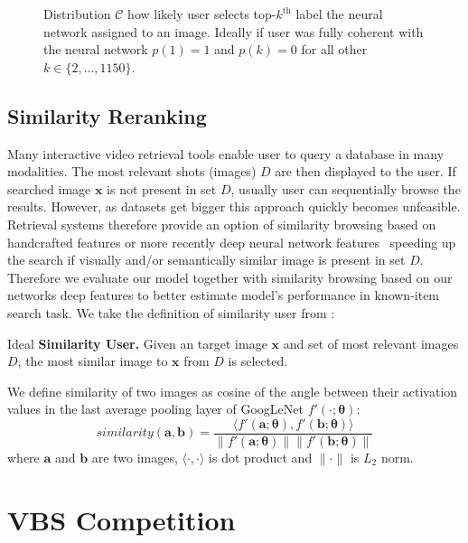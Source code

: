 \begin{figure}
	\centering
	
	
	\caption[Agreement between user and neural network labeling]{Distribution $\mathcal{C}$ how likely user selects top-$k^{\mathrm{th}}$ label the neural network assigned to an image. Ideally if user was fully coherent with the neural network $p(1)=1$ and $p(k)=0$ for all other $k\in\{2,\dots,1150\}$.
	}
	\label{fig:class_distribution}
\end{figure}


\subsection{Similarity Reranking}
Many interactive video retrieval tools enable user to query a database in many modalities. The most relevant shots (images) $D$ are then displayed to the user. If searched image $\bm{x}$ is not present in set $D$, usually user can sequentially browse the results. However, as datasets get bigger this approach quickly becomes unfeasible. Retrieval systems therefore provide an option of similarity browsing based on handcrafted features or more recently deep neural network features~\cite{lokovc2018revisiting, barthel2018fusing} speeding up the search if visually and/or semantically similar image is present in set $D$. Therefore we evaluate our model together with similarity browsing based on our networks deep features to better estimate model's performance in known-item search task. We take the definition of similarity user from \cite{kovalvcik2017comparison}:
\begin{description}[labelwidth=1em, leftmargin=!]
	\item Ideal \textbf{Similarity User.} Given an target image $\bm{x}$ and set of most relevant images $D$, the most similar image to $\bm{x}$ from $D$ is selected.
\end{description}
We define similarity of two images as cosine of the angle between their activation values in the last average pooling layer of GoogLeNet $f'(\cdot;\bm{\theta})$:
\begin{equation}
similarity(\bm{a},\bm{b}) = \frac{\langle f'(\bm{a};\bm{\theta}),f'(\bm{b};\bm{\theta})\rangle}{\|f'(\bm{a};\bm{\theta})\|\|f'(\bm{b};\bm{\theta})\|}
\end{equation}
where $\bm{a}$ and $\bm{b}$ are two images, $\langle\cdot,\cdot\rangle$ is dot product and $\|\cdot\|$ is $L_2$ norm.

\section{VBS Competition}

